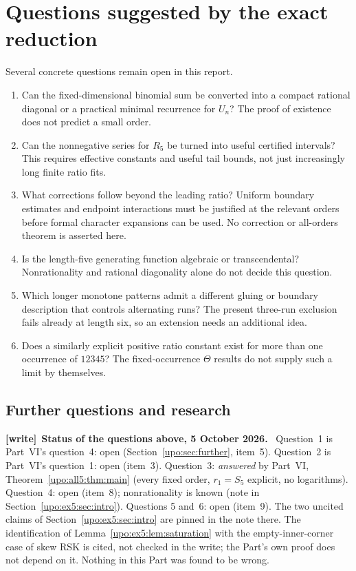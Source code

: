 \documentclass[11pt,letterpaper]{article}
\theoremstyle{remark}\newtheorem{remark}[theorem]{Remark}
\numberwithin{equation}{section}
\newenvironment{writenote}[1][]{\par\smallskip\begingroup\small
 \noindent\textbf{[write]}\if\relax\detokenize{#1}\relax\else~\textbf{#1.}\fi\ }%
 {\par\endgroup\smallskip}
\begin{document}
\section{Questions suggested by the exact reduction}\label{upo:ex5:sec:questions}
Several concrete questions remain open in this report.
\begin{enumerate}
\item Can the fixed-dimensional binomial sum be converted into a
compact rational diagonal or a practical minimal recurrence for
$U_n$? The proof of existence does not predict a small order.
\item Can the nonnegative series for $R_5$ be turned into useful
certified intervals? This requires effective constants and useful
tail bounds, not just increasingly long finite ratio fits.
\item What corrections follow beyond the leading ratio? Uniform
boundary estimates and endpoint interactions must be justified at
the relevant orders before formal character expansions can be
used. No correction or all-orders theorem is asserted here.
\item Is the length-five generating function algebraic or
transcendental? Nonrationality and rational diagonality alone do
not decide this question.
\item Which longer monotone patterns admit a different gluing or
boundary description that controls alternating runs? The present
three-run exclusion fails already at length six, so an extension
needs an additional idea.
\item Does a similarly explicit positive ratio constant exist for
more than one occurrence of $12345$? The fixed-occurrence
$\Theta$ results do not supply such a limit by themselves.
\end{enumerate}
\subsection{Further questions and research}\label{upo:ex5:sub:further}
\begin{writenote}[Status of the questions above, 5 October 2026]
Question~1 is Part~VI's question~4: open (Section~\ref{upo:sec:further}, item~5). Question~2 is Part~VI's question~1: open (item~3). Question~3: \emph{answered} by Part~VI, Theorem~\ref{upo:all5:thm:main} (every fixed order, $r_1=S_5$ explicit, no logarithms). Question~4: open (item~8); nonrationality is known (note in Section~\ref{upo:ex5:sec:intro}). Questions 5 and~6: open (item~9). The two uncited claims of Section~\ref{upo:ex5:sec:intro} are pinned in the note there. The identification of Lemma~\ref{upo:ex5:lem:saturation} with the empty-inner-corner case of skew RSK \cite{SS} is cited, not checked in the write; the Part's own proof does not depend on it. Nothing in this Part was found to be wrong.
\end{writenote}
\end{document}

